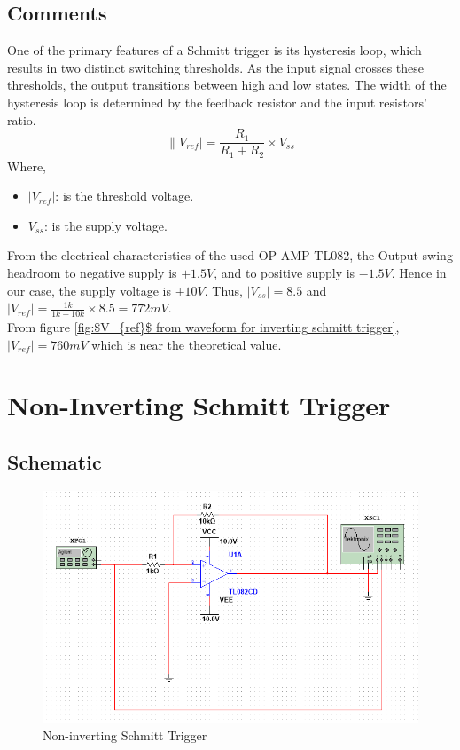 \documentclass[a4paper, 12pt, english]{article}
\begin{document}
\subsection{Comments}
One of the primary features of a Schmitt trigger is its hysteresis loop, which results in two distinct switching thresholds. As the input signal crosses these thresholds, the output transitions between high and low states. The width of the hysteresis loop is determined by the feedback resistor and the input resistors' ratio. 
\[ \|V_{ref}| = \frac{R_{1}}{R_{1} + R_{2}}  \times V_{ss}\]
Where, \begin{itemize}
    \item $|V_{ref}|$: is the threshold voltage.
    \item $V_{ss}$: is the supply voltage.
\end{itemize}
From the electrical characteristics of the used OP-AMP TL082, the Output swing headroom to negative supply is $+1.5 V$, and to positive supply is $-1.5 V$. Hence in our case, the supply voltage is $\pm{10V}$. Thus, $|V_{ss}|=8.5$ and \(|V_{ref}|=\frac{1k}{1k+10k}\times8.5=772mV\). \\
From figure \ref{fig:$V_{ref}$ from waveform for inverting schmitt trigger}, $|V_{ref}|=760mV$ which is near the theoretical value.

\newpage
\section{Non-Inverting Schmitt Trigger}
\subsection{Schematic}
\begin{figure}[H]
 \centering
 \includegraphics[width=\linewidth]{images/Non-Inverting-Schmitt-Trigger.png}
 \caption{Non-inverting Schmitt Trigger}
 \label{fig:Non-inverting Schmitt Trigger}
\end{figure}
\end{document}
